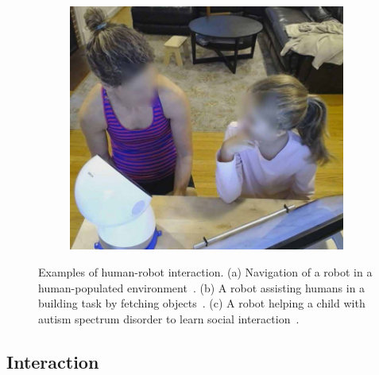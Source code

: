 \begin{figure}
    \begin{subfigure}[c]{0.36\textwidth}
        \centering
        \includegraphics[width=\textwidth]{Figures/MADRL/robsocial.png}
        \caption{}
        \label{fig:robsocial}
    \end{subfigure}
    \caption{Examples of human-robot interaction. (a) Navigation of a robot in a human-populated environment~\citep{Chen2017_CollisionAvoidance}. (b) A robot assisting humans in a building task by fetching objects~\citep{Gombolay2017_MixedInitiative}. (c) A robot helping a child with autism spectrum disorder to learn social interaction~\citep{Scassellati2018_ASDRobot}.}
    \label{fig:HRI_examples}
\end{figure}

\subsection{Interaction}\label{sec:MADRL:Interaction}


